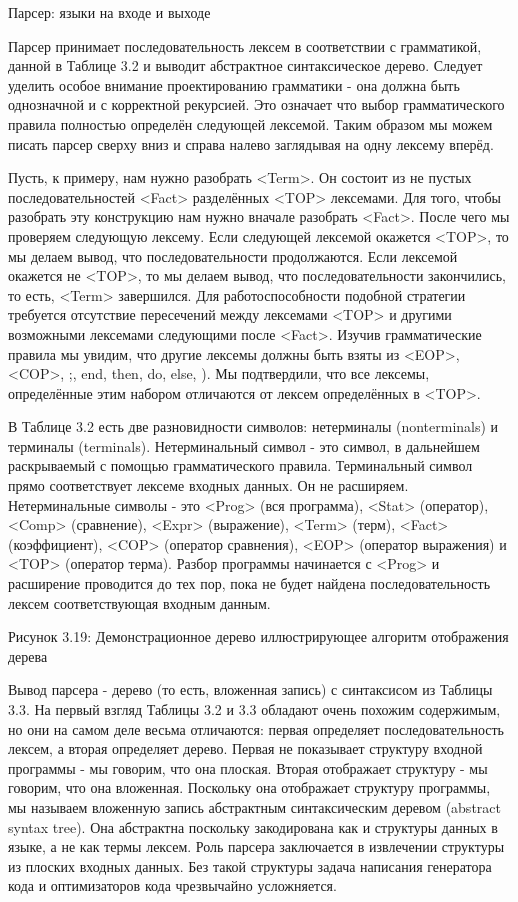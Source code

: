 Парсер: языки на входе и выходе

Парсер принимает последовательность лексем в соответствии с грамматикой, данной в Таблице 3.2 и выводит абстрактное синтаксическое дерево. Следует уделить особое внимание проектированию грамматики - она должна быть однозначной и с корректной рекурсией. Это означает что выбор грамматического правила полностью определён следующей лексемой. Таким образом мы можем писать парсер сверху вниз и справа налево заглядывая на одну лексему вперёд.

Пусть, к примеру, нам нужно разобрать <Term>. Он состоит из не пустых последовательностей <Fact> разделённых <TOP> лексемами. Для того, чтобы разобрать эту конструкцию нам нужно вначале разобрать <Fact>. После чего мы проверяем следующую лексему. Если следующей лексемой окажется <TOP>, то мы делаем вывод, что последовательности продолжаются. Если лексемой окажется не <TOP>, то мы делаем вывод, что последовательности закончились, то есть, <Term> завершился. Для работоспособности подобной стратегии требуется отсутствие пересечений между лексемами <TOP> и другими возможными лексемами следующими после <Fact>. Изучив грамматические правила мы увидим, что другие лексемы должны быть взяты из {<EOP>, <COP>, ;, end, then, do, else, )}. Мы подтвердили, что все лексемы, определённые этим набором отличаются от лексем определённых в <TOP>.

В Таблице 3.2 есть две разновидности символов: нетерминалы (nonterminals) и терминалы (terminals). Нетерминальный символ - это символ, в дальнейшем раскрываемый с помощью грамматического правила. Терминальный символ прямо соответствует лексеме входных данных. Он не расширяем. Нетерминальные символы - это <Prog> (вся программа), <Stat> (оператор), <Comp> (сравнение), <Expr> (выражение), <Term> (терм), <Fact> (коэффициент), <COP> (оператор сравнения), <EOP> (оператор выражения) и <TOP> (оператор терма). Разбор программы начинается с <Prog> и расширение проводится до тех пор, пока не будет найдена последовательность лексем соответствующая входным данным.

Рисунок 3.19: Демонстрационное дерево иллюстрирующее алгоритм отображения дерева

Вывод парсера - дерево (то есть, вложенная запись) с синтаксисом из Таблицы 3.3. На первый взгляд Таблицы 3.2 и 3.3 обладают очень похожим содержимым, но они на самом деле весьма отличаются: первая определяет последовательность лексем, а вторая определяет дерево. Первая не показывает структуру входной программы - мы говорим, что она плоская. Вторая отображает структуру - мы говорим, что она вложенная. Поскольку она отображает структуру программы, мы называем вложенную запись абстрактным синтаксическим деревом (abstract syntax tree). Она абстрактна поскольку закодирована как и структуры данных в языке, а не как термы лексем. Роль парсера заключается в извлечении структуры из плоских входных данных. Без такой структуры задача написания генератора кода и оптимизаторов кода чрезвычайно усложняется.

